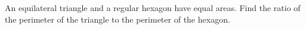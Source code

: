 An equilateral triangle and a regular hexagon have equal areas. Find the ratio of the perimeter of the triangle to the perimeter of the hexagon.
